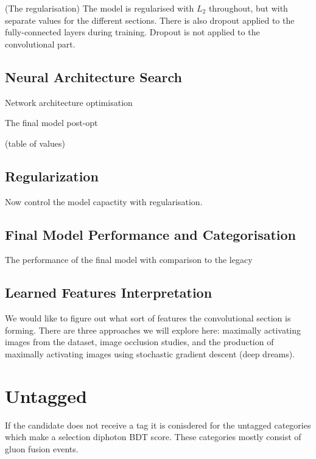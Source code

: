 (The regularisation)
The model is regularised with $L_2$ throughout, but with separate values for the different sections. There is also dropout applied to the fully-connected layers during training. 
Dropout is not applied to the convolutional part. 


\subsection{Neural Architecture Search}
Network architecture optimisation

The final model post-opt 

(table of values)

\subsection{Regularization}
Now control the model capactity with regularisation. 

\subsection{Final Model Performance and Categorisation}
The performance of the final model with comparison to the legacy

\subsection{Learned Features Interpretation}
We would like to figure out what sort of features the convolutional section is forming. There are three approaches we will explore here: maximally activating images from the dataset, image occlusion studies, and the production of maximally activating images using stochastic gradient descent (deep dreams).  


\section{Untagged}
If the candidate does not receive a tag it is conisdered for the untagged categories which make a selection diphoton BDT score. These categories mostly consist of gluon fusion events. 


